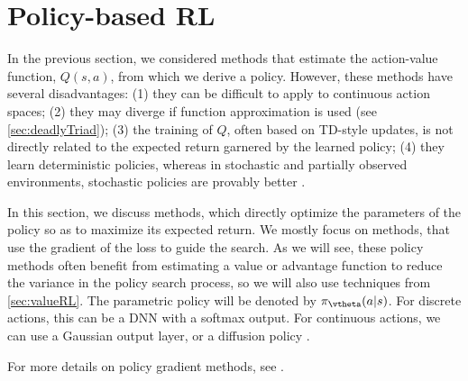 \chapter{Policy-based RL}
\label{sec:policySearch}




In the previous section, we considered methods that
estimate the action-value function, $Q(s,a)$,
from which we derive a policy.
However, these methods have several disadvantages:
(1)  they can be difficult to apply to continuous action spaces;
(2) they may diverge if function approximation is used (see
\cref{sec:deadlyTriad});  
(3) the training of $Q$, often based on TD-style updates,
is not directly related to the expected return
garnered by the learned policy;
(4) they learn deterministic policies,
whereas in stochastic and partially observed environments,
stochastic policies are provably better
\citep{Jaakkola94}.

In this section, we discuss
 methods,
which directly optimize the parameters of the policy
so as to maximize its expected return.
We mostly focus on  methods,
that use the gradient of the loss to guide the search.
As we will see,  these policy methods often 
benefit from estimating a value or advantage function
to reduce the variance in the policy search process,
so we will also use techniques from \cref{sec:valueRL}.
The parametric policy will be denoted by 
$\pi_{\vtheta}(a|s)$.
For discrete actions, this can be a DNN with a softmax output.
For continuous actions, we can use a Gaussian output layer,
or a diffusion policy \citep{Ren2024}.

For more details on policy gradient methods, see \citep{weng2018PG,Lehmann2024}.




